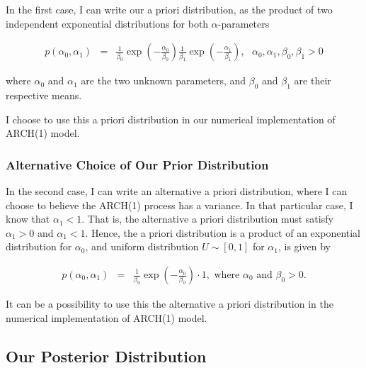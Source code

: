 \documentclass[a4paper,11pt,english]{article}
\begin{document}
			In the first case, I can write our a priori distribution, as the product of two independent exponential distributions for both 
			$\alpha$-parameters
			
			\begin{eqnarray} \label{eq:prior}
				p(\alpha_0, \alpha_1) &=& \frac{1}{\beta_0}\exp{(-\frac{\alpha_0}{\beta_0})}\frac{1}{\beta_1} \exp{(-\frac{\alpha_1}{\beta_1})}, \text{ } 
				\alpha_0, \alpha_1, \beta_0, \beta_1 > 0
			\end{eqnarray}
	
			where $\alpha_0$ and $\alpha_1$ are the two unknown parameters, and $\beta_0$ and $\beta_1$ are their respective means.

			I choose to use this a priori distribution in our numerical implementation of ARCH(1) model.
	
			
			\subsubsection{Alternative Choice of Our Prior Distribution}
	
			In the second case, I can write an alternative a priori distribution, where I can choose to believe the ARCH(1) process has a variance. 
			In that particular case, I know that $\alpha_1 < 1$. That is, the alternative a priori distribution must satisfy $\alpha_1 > 0$ and 
			$\alpha_1 < 1$. Hence, the a priori distribution is a product of an exponential distribution for $\alpha_0$, and uniform distribution 
			$U \sim \left[0, 1\right]$ for $\alpha_1$, is given by 
			
			\begin{eqnarray*}
				p(\alpha_0, \alpha_1) &=& \frac{1}{\beta_0}\exp{(-\frac{\alpha_0}{\beta_0})}\cdot 1, \text{ where } \alpha_0  \text{ and } \beta_0 > 0.
			\end{eqnarray*}
	
			It can be a possibility to use this the alternative a priori distribution in the numerical implementation of ARCH(1) model.


		\subsection{Our Posterior Distribution}
	
\end{document}
